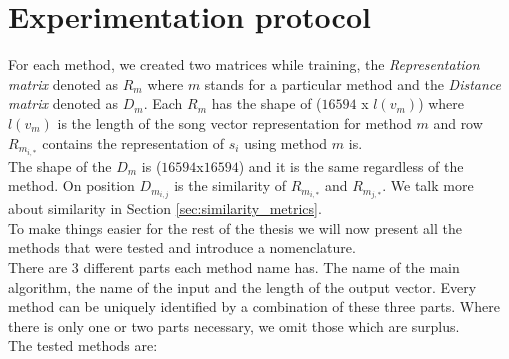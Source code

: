 \section{Experimentation protocol}
For each method, we created two matrices while training, the \textit{Representation matrix} denoted as  $R_m$ where $m$ stands for a particular method and the \textit{Distance matrix} denoted as $D_m$. Each $R_m$ has the shape of ($16594$ x $l(v_m) $) where $l(v_m)$ is the length of the song vector representation for method $m$ and row $R_{m_{i,*}}$ contains the representation of $s_i$ using method $m$ is.\\
The shape of the $D_m$ is ($16594 $x$ 16594$) and it is the same regardless of the method. On position $D_{m_{i,j}}$ is the similarity of $R_{m_{i,*}}$ and $R_{m_{j,*}}$. We talk more about similarity in Section \ref{sec:similarity_metrics}. \\
To make things easier for the rest of the thesis we will now present all the methods that were tested and introduce a nomenclature. \\
There are 3 different parts each method name has. The name of the main algorithm, the name of the input and the length of the output vector. Every method can be uniquely identified by a combination of these three parts. Where there is only one or two parts necessary, we omit those which are surplus. \\
The tested methods are:
\renewcommand\labelitemii{\textperiodcentered}
